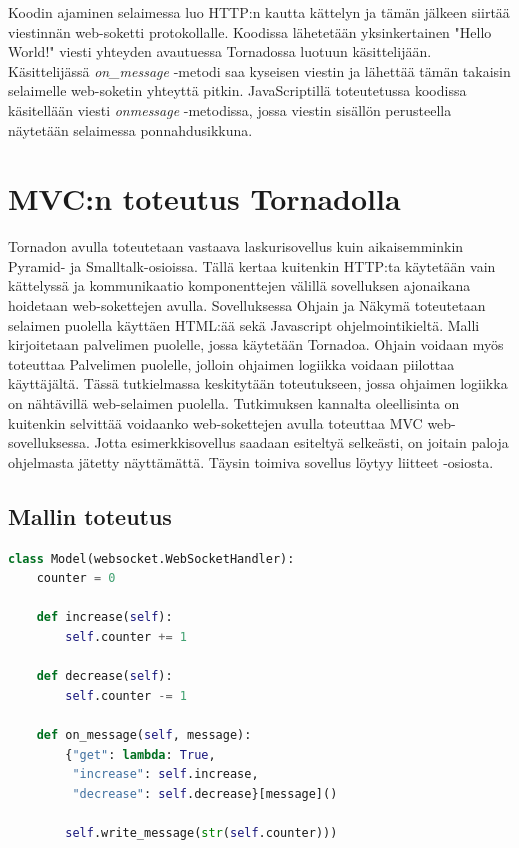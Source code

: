 \documentclass[utf8]{gradu3}
\begin{document}
Koodin ajaminen selaimessa luo HTTP:n kautta kättelyn ja tämän jälkeen siirtää viestinnän web-soketti protokollalle. Koodissa lähetetään yksinkertainen "Hello World!" viesti yhteyden avautuessa Tornadossa luotuun käsittelijään. Käsittelijässä \emph{on\_message} -metodi saa kyseisen viestin ja lähettää tämän takaisin selaimelle web-soketin yhteyttä pitkin. JavaScriptillä toteutetussa koodissa käsitellään viesti \emph{onmessage} -metodissa, jossa viestin sisällön perusteella näytetään selaimessa ponnahdusikkuna. 



\chapter{MVC:n toteutus Tornadolla}
Tornadon avulla toteutetaan vastaava laskurisovellus kuin aikaisemminkin Pyramid- ja Smalltalk-osioissa. Tällä kertaa kuitenkin HTTP:ta käytetään vain kättelyssä ja kommunikaatio komponenttejen välillä sovelluksen ajonaikana hoidetaan web-sokettejen avulla. Sovelluksessa Ohjain ja Näkymä toteutetaan selaimen puolella käyttäen HTML:ää sekä Javascript ohjelmointikieltä. Malli kirjoitetaan palvelimen puolelle, jossa käytetään Tornadoa. Ohjain voidaan myös toteuttaa Palvelimen puolelle, jolloin ohjaimen logiikka voidaan piilottaa käyttäjältä. Tässä tutkielmassa keskitytään toteutukseen, jossa ohjaimen logiikka on nähtävillä web-selaimen puolella. Tutkimuksen kannalta oleellisinta on kuitenkin selvittää voidaanko web-sokettejen avulla toteuttaa MVC web-sovelluksessa. Jotta esimerkkisovellus saadaan esiteltyä selkeästi, on joitain paloja ohjelmasta jätetty näyttämättä. Täysin toimiva sovellus löytyy liitteet -osiosta. 

\section{Mallin toteutus}

\begin{lstlisting}[language=Python]
class Model(websocket.WebSocketHandler):
    counter = 0

    def increase(self):
        self.counter += 1

    def decrease(self):
        self.counter -= 1

    def on_message(self, message):
        {"get": lambda: True,
         "increase": self.increase,
         "decrease": self.decrease}[message]()

        self.write_message(str(self.counter)))

\end{lstlisting}
\end{document}
